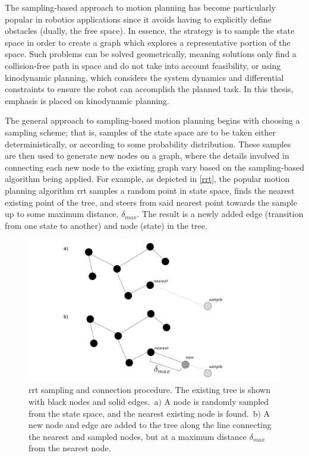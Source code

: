 The sampling-based approach to motion planning has become particularly popular in robotics applications since it avoids having to explicitly define obstacles (dually, the free space). In essence, the strategy is to sample the state space in order to create a graph which explores a representative portion of the space. Such problems can be solved geometrically, meaning solutions only find a collision-free path in space and do not take into account feasibility, or using kinodynamic planning, which considers the system dynamics and differential constraints to ensure the robot can accomplish the planned task. In this thesis, emphasis is placed on kinodynamic planning.

The general approach to sampling-based motion planning begins with choosing a sampling scheme; that is, samples of the state space are to be taken either deterministically, or according to some probability distribution. These samples are then used to generate new nodes on a graph, where the details involved in connecting each new node to the existing graph vary based on the sampling-based algorithm being applied. For example, as depicted in \autoref{rrt}, the popular motion planning algorithm \gls{rrt} samples a random point in state space, finds the nearest existing point of the tree, and steers from said nearest point towards the sample up to some maximum distance, $\delta_{max}$. The result is a newly added edge (transition from one state to another) and node (state) in the tree.

\begin{figure}
    \begin{center}
        \includegraphics[width=\textwidth]{./figures/RRT_figure.pdf}
    \end{center}
    \caption[RRT sampling and connection procedure]{\gls{rrt} sampling and connection procedure. The existing tree is shown with black nodes and solid edges.\ $\text{a}\rparen$ A node is randomly sampled from the state space, and the nearest existing node is found.\ $\text{b}\rparen$ A new node and edge are added to the tree along the line connecting the nearest and sampled nodes, but at a maximum distance $\delta_{max}$ from the nearest node.}
\label{rrt}
\end{figure}

